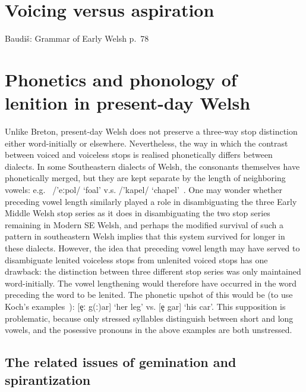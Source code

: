 \section{Voicing versus aspiration}
\label{sec:voic-vers-aspir}

Baudiš: Grammar of Early Welsh p.~78
\Textcite[40, 43, 45]{LP_Concise37}



\section{Phonetics and phonology of lenition in present-day Welsh} 
Unlike Breton, present-day Welsh does not preserve a three-way stop distinction either word-initially or elsewhere. Nevertheless, the way in which the contrast between voiced and voiceless stops is realised phonetically differs between dialects. In some Southeastern dialects of Welsh, the consonants themselves have phonetically merged, but they are kept separate by the length of neighboring vowels: e.g.\  /'eːpol/ `foal' v.s.  /'kapel/ `chapel'~\autocite[85]{awbery_phonotactic_1984}. One may wonder whether preceding vowel length similarly played a role in disambiguating the three Early Middle Welsh stop series as it does in disambiguating the two stop series remaining in Modern SE Welsh, and perhaps the modified survival of such a pattern in southeastern Welsh implies that this system survived for longer in these dialects. However, the idea that preceding vowel length may have served to disambiguate lenited voiceless stops from unlenited voiced stops has one drawback: the distinction between three different stop series was only maintained word-initially. The vowel lengthening would therefore have occurred in the word preceding the word to be lenited. The phonetic upshot of this would be (to use Koch's examples~\autocite*[§~26]{koch_*cothairche_1990}): [\c{e}ː g(ː)ar] `her leg' vs. [\c{e} gar] `his car'. This supposition is problematic, because only stressed syllables distinguish between short and long vowels, and the posessive pronouns in the above examples are both unstressed. 


\subsection{The related issues of gemination and spirantization}
\cite{jackson_language_1953,martinet_celtic_1952,schrijver_spirantization_1999,isaac_old-_2004}
